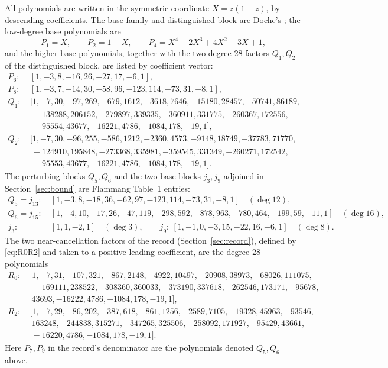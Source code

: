 \documentclass[11pt,reqno]{amsart}
\theoremstyle{plain}
\theoremstyle{definition}
\theoremstyle{remark}
\begin{document}
All polynomials are written in the symmetric coordinate $X=z(1-z)$, by descending
coefficients. The base family and distinguished block are Doche's \citep{Doc01b}; the
low-degree base polynomials are
\[
  P_1=X,\qquad P_2=1-X,\qquad P_4=X^4-2X^3+4X^2-3X+1,
\]
and the higher base polynomials, together with the two degree-$28$ factors $Q_1,Q_2$
of the distinguished block, are listed by coefficient vector:
{\small
\begin{align*}
P_6:&\ [1,-3,8,-16,26,-27,17,-6,1],\\
P_8:&\ [1,-3,7,-14,30,-58,96,-123,114,-73,31,-8,1],\\
Q_1:&\ [1,-7,30,-97,269,-679,1612,-3618,7646,-15180,28457,-50741,86189,\\
   &\ \ -138288,206152,-279897,339335,-360911,331775,-260367,172556,\\
   &\ \ -95554,43677,-16221,4786,-1084,178,-19,1],\\
Q_2:&\ [1,-7,30,-96,255,-586,1212,-2360,4573,-9148,18749,-37783,71770,\\
   &\ \ -124910,195848,-273368,335981,-359545,331349,-260271,172542,\\
   &\ \ -95553,43677,-16221,4786,-1084,178,-19,1].
\end{align*}}
The perturbing blocks $Q_5,Q_6$ and the two base blocks $j_3,j_9$ adjoined in
Section~\ref{sec:bound} are Flammang \citep{F18} Table~1 entries:
{\small
\begin{align*}
Q_5=j_{13}:&\ [1,-3,8,-18,36,-62,97,-123,114,-73,31,-8,1]\quad(\deg 12),\\
Q_6=j_{15}:&\ [1,-4,10,-17,26,-47,119,-298,592,-878,963,-780,464,-199,59,-11,1]\quad(\deg 16),\\
j_3:&\ [1,1,-2,1]\quad(\deg 3),\qquad
j_9:\ [1,-1,0,-3,15,-22,16,-6,1]\quad(\deg 8).
\end{align*}}
The two near-cancellation factors of the \citet{Gri26} record
(Section~\ref{sec:record}), defined by \eqref{eq:R0R2} and taken to a positive
leading coefficient, are the degree-$28$ polynomials
{\small
\begin{align*}
R_0:&\ [1,-7,31,-107,321,-867,2148,-4922,10497,-20908,38973,-68026,111075,\\
   &\ \ -169111,238522,-308360,360033,-373190,337618,-262546,173171,-95678,\\
   &\ \ 43693,-16222,4786,-1084,178,-19,1],\\
R_2:&\ [1,-7,29,-86,202,-387,618,-861,1256,-2589,7105,-19328,45963,-93546,\\
   &\ \ 163248,-244838,315271,-347265,325506,-258092,171927,-95429,43661,\\
   &\ \ -16220,4786,-1084,178,-19,1].
\end{align*}}
Here $P_7,P_9$ in the record's denominator are the polynomials denoted $Q_5,Q_6$
above.



\end{document}
